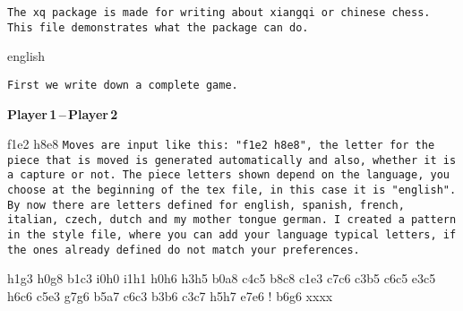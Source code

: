 \documentclass[twocolumn,11pt]{article}
\begin{document}
\texttt{The xq package is made for writing about xiangqi or chinese chess. This file demonstrates what the package can do.}

\mylanguage english
%
%

\bigskip
\texttt{First we write down a complete game.}
\newgame

\begin{center}
{\bf\large{Player\,1\,--\,Player\,2}}
\end{center}

\move f1e2 h8e8 
\bigskip
\texttt{Moves are input like this: "f1e2 h8e8", the letter for the piece that is moved is generated automatically and also, whether it is a capture or not. The piece letters shown depend on the language, you choose at the beginning of the tex file, in this case it is "english". By now there are letters defined for english, spanish, french, italian, czech, dutch and my mother tongue german. I created a pattern in the style file, where you can add your language typical letters, if the ones already defined do not match your preferences.} \\
\bigskip

\move h1g3 h0g8
\move b1c3 i0h0
\move i1h1 h0h6
\move h3h5 b0a8
\move c4c5 b8c8
\move c1e3 c7c6
\move c3b5 c6c5
\move e3c5 h6c6
\move c5e3 g7g6
\move b5a7 c6c3
\move b3b6 c3c7
\move h5h7 e7e6
\cr ! 
\move b6g6 xxxx 
\end{document}
